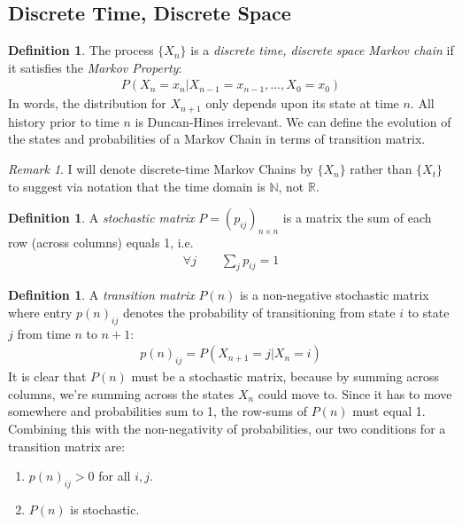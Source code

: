 \documentclass[12pt]{article}
\theoremstyle{plain}
\theoremstyle{definition}
\newtheorem{defn}[thm]{Definition}
\theoremstyle{remark}
\newtheorem*{rmk}{Remark}
\begin{document}
\subsection{Discrete Time, Discrete Space}

\begin{defn}
The process $\{X_n\}$ is a \emph{discrete time, discrete space Markov
chain} if it satisfies the \emph{Markov Property}:
\begin{align*}
  P(X_n = x_n | X_{n-1}=x_{n-1}, \ldots, X_0 =x_0)
\end{align*}
In words, the distribution for $X_{n+1}$ only depends upon its state at
time $n$. All history prior to time $n$ is Duncan-Hines irrelevant.
We can define the evolution of the states and probabilities of a Markov
Chain in terms of transition matrix.
\end{defn}
\begin{rmk}
I will denote discrete-time Markov Chains by $\{X_n\}$ rather than
$\{X_t\}$ to suggest via notation that the time domain is $\mathbb{N}$,
not $\mathbb{R}$.
\end{rmk}

\begin{defn}
A \emph{stochastic matrix} $P=(p_{ij})_{n\times n}$ is a matrix the sum
of each row (across columns) equals 1, i.e.
\begin{align*}
  \forall j \qquad \sum_j p_{ij} = 1
\end{align*}
\end{defn}

\begin{defn}
A \emph{transition matrix} $P(n)$ is a non-negative stochastic matrix
where entry $p(n)_{ij}$ denotes the probability of transitioning from
state $i$ to state $j$ from time $n$ to $n+1$:
\begin{align*}
  p(n)_{ij} = P(X_{n+1}=j | X_n=i)
\end{align*}
It is clear that $P(n)$ must be a stochastic matrix, because by summing
across columns, we're summing across the states $X_n$ could move to.
Since it has to move somewhere and probabilities sum to 1, the row-sums
of $P(n)$ must equal 1. Combining this with the non-negativity of
probabilities, our two conditions for a transition matrix are:
\begin{enumerate}
  \item $p(n)_{ij}>0$ for all $i,j$.
  \item $P(n)$ is stochastic.
\end{enumerate}
\end{defn}
\end{document}

